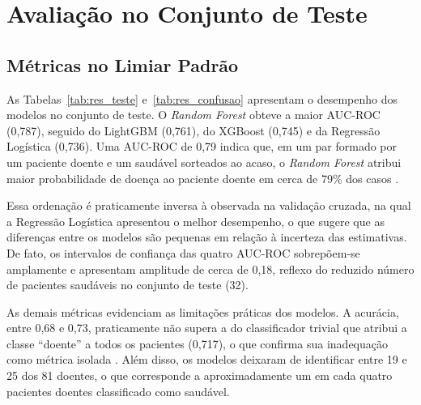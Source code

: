 \section{Avaliação no Conjunto de Teste}
\label{sec:res_teste}

\subsection{Métricas no Limiar Padrão}

As Tabelas~\ref{tab:res_teste} e~\ref{tab:res_confusao} apresentam o desempenho dos modelos no conjunto de teste. O \textit{Random Forest} obteve a maior AUC-ROC (0,787), seguido do LightGBM (0,761), do XGBoost (0,745) e da Regressão Logística (0,736). Uma AUC-ROC de 0,79 indica que, em um par formado por um paciente doente e um saudável sorteados ao acaso, o \textit{Random Forest} atribui maior probabilidade de doença ao paciente doente em cerca de 79\% dos casos \cite{Hanley1982Meaning}.

Essa ordenação é praticamente inversa à observada na validação cruzada, na qual a Regressão Logística apresentou o melhor desempenho, o que sugere que as diferenças entre os modelos são pequenas em relação à incerteza das estimativas. De fato, os intervalos de confiança das quatro AUC-ROC sobrepõem-se amplamente e apresentam amplitude de cerca de 0,18, reflexo do reduzido número de pacientes saudáveis no conjunto de teste (32).

As demais métricas evidenciam as limitações práticas dos modelos. A acurácia, entre 0,68 e 0,73, praticamente não supera a do classificador trivial que atribui a classe ``doente'' a todos os pacientes (0,717), o que confirma sua inadequação como métrica isolada \cite{FAWCETT2006861}. Além disso, os modelos deixaram de identificar entre 19 e 25 dos 81 doentes, o que corresponde a aproximadamente um em cada quatro pacientes doentes classificado como saudável.

